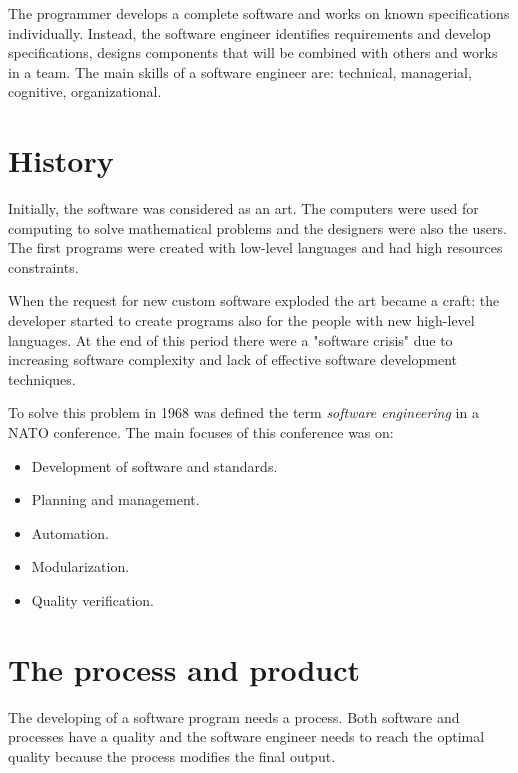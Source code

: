 \documentclass[12pt, a4paper]{report}
\begin{document}
    The programmer develops a complete software and works on known specifications individually. Instead, the software engineer 
    identifies requirements and develop specifications, designs components that will be combined with others and works in a team.
    The main skills of a software engineer are: technical, managerial, cognitive, organizational.

    \section{History}
    Initially, the software was considered as an art. The computers were used for computing to solve mathematical problems and 
    the designers were also the users. The first programs were created with low-level languages and had high resources constraints. 
    
    When the request for new custom software exploded the art became a craft: the developer started to create programs also 
    for the people with new high-level languages. At the end of this period there were a "software crisis" due to increasing software 
    complexity and lack of effective software development techniques. 
    
    To solve this problem in 1968 was defined the term \emph{software engineering} in a NATO conference. 
    The main focuses of this conference was on: 
    \begin{itemize}
        \item Development of software and standards.
        \item Planning and management.
        \item Automation.
        \item Modularization.
        \item Quality verification.
    \end{itemize}

    \section{The process and product}
    The developing of a software program needs a process. Both software and processes have a quality and the software engineer 
    needs to reach the optimal quality because the process modifies the final output.
    
\end{document}
